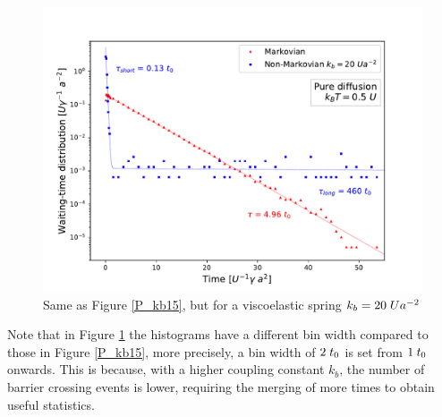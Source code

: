 \begin{figure}
    \centering
    \includegraphics[width=\textwidth]{kb20_T05.pdf}
    \caption{Same as Figure \ref{P_kb15}, but for a viscoelastic spring $k_b=20\hspace{0.1cm}Ua^{-2}$}
    \label{P_kb20}
\end{figure}
Note that in Figure \ref{P_kb20} the histograms have a different bin width compared to those in Figure \ref{P_kb15}, more precisely, a bin width of $2\hspace{0.1cm}t_0$ is set from $1\hspace{0.1cm}t_0$ onwards. This is because, with a higher coupling constant $k_b$, the number of barrier crossing events is lower, requiring the merging of more times to obtain useful statistics.
\clearpage

